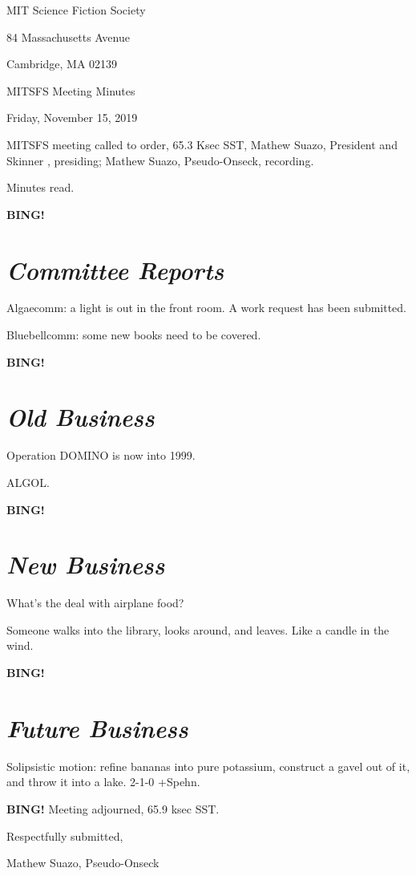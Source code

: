 \documentclass[10pt]{article}
\newcommand{\bing}{{\bf BING!} }
\newcommand{\goto}[1]{\bing \vskip 12pt \section*{{\em{#1}}}}
\newcommand{\skinner}{Mathew Suazo, President and Skinner }
\newcommand{\onseck}{Mathew Suazo, Pseudo-Onseck}
\newcommand{\meetingdate}{Friday, November 15, 2019 }
\begin{document}
\begin{center}

MIT Science Fiction Society

84 Massachusetts Avenue

Cambridge, MA 02139

\vspace{12pt}

MITSFS Meeting Minutes

\meetingdate

\end{center}

\vspace{18pt}

\setlength{\parskip}{6pt}

\noindent
MITSFS meeting called to order, 65.3 Ksec SST,
\skinner, presiding; \onseck, recording.

Minutes read.

\goto{Committee Reports}

Algaecomm: a light is out in the front room. A work request has been submitted.

Bluebellcomm: some new books need to be covered.

\goto{Old Business}

Operation DOMINO is now into 1999.

ALGOL.

\goto{New Business}

What's the deal with airplane food?

Someone walks into the library, looks around, and leaves. Like a candle in the wind.

\goto{Future Business}

Solipsistic motion: refine bananas into pure potassium, construct a gavel out of it, and throw it into a lake. 2-1-0 +Spehn.

\bing
\noindent
Meeting adjourned, 65.9 ksec SST.

\vspace{18pt}

\centerline{Respectfully submitted,}
\centerline{\onseck}
\end{document}
